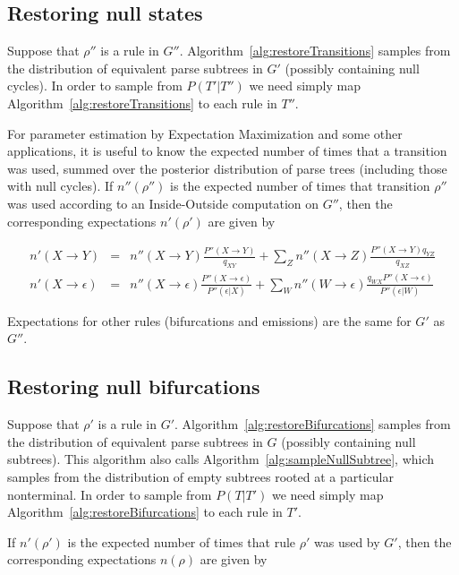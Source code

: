 \documentclass[10pt]{article}
\begin{document}
\subsection{Restoring null states}

Suppose that $\rho''$ is a rule in $G''$.
Algorithm~\ref{alg:restoreTransitions} samples from the distribution of equivalent parse subtrees in $G'$ (possibly containing null cycles).
In order to sample from $P(T'|T'')$ we need simply map Algorithm~\ref{alg:restoreTransitions} to each rule in $T''$.

For parameter estimation by Expectation Maximization and some other applications, it is useful to know the expected number
of times that a transition was used, summed over the posterior distribution of parse trees (including those with null cycles).
If $n''(\rho'')$ is the expected number of times that transition $\rho''$ was used according to an Inside-Outside computation on $G''$,
then the corresponding expectations $n'(\rho')$ are given by

\begin{eqnarray*}
       n'(X \to Y) & = & n''(X \to Y) \frac{P''(X \to Y)}{q_{XY}} + \sum_Z n''(X \to Z) \frac{P''(X \to Y) q_{YZ}}{q_{XZ}} \\
n'(X \to \epsilon) & = & n''(X \to \epsilon) \frac{P''(X \to \epsilon)}{P''(\epsilon | X)}
 + \sum_W n''(W \to \epsilon) \frac{q_{WX} P''(X \to \epsilon)}{P''(\epsilon | W)}
\end{eqnarray*}

Expectations for other rules (bifurcations and emissions) are the same for $G'$ as $G''$.


\subsection{Restoring null bifurcations}

Suppose that $\rho'$ is a rule in $G'$.
Algorithm~\ref{alg:restoreBifurcations} samples from the distribution of equivalent parse subtrees in $G$ (possibly containing null subtrees).
This algorithm also calls Algorithm~\ref{alg:sampleNullSubtree}, which samples from the distribution of empty subtrees rooted at a particular nonterminal.
In order to sample from $P(T|T')$ we need simply map Algorithm~\ref{alg:restoreBifurcations} to each rule in $T'$.

If $n'(\rho')$ is the expected number of times that rule $\rho'$ was used by $G'$,
then the corresponding expectations $n(\rho)$ are given by
\end{document}
